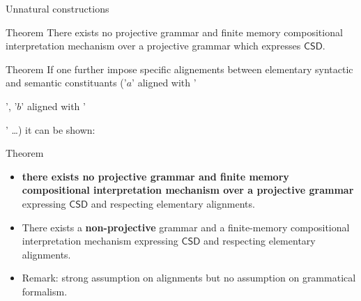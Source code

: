 \documentclass{beamer}
\begin{document}
\begin{frame}{Unnatural constructions}
  \begin{alertblock}{ Theorem }
    There exists no projective grammar and finite memory compositional interpretation mechanism over a projective grammar which expresses $\mathsf{CSD}$.
  \end{alertblock}

\end{frame}


\begin{frame}{Theorem}
  If one further impose specific alignements between elementary syntactic and semantic constituants ('$a$' aligned with '', '$b$' aligned with '' \dots) %
  it can be shown:

  \begin{block}{Theorem}
    \begin{itemize}
    \item \textbf{there exists no projective grammar and finite memory compositional interpretation mechanism over a projective grammar} expressing $\mathsf{CSD}$ and respecting elementary alignments.
    \item There exists a \textbf{non-projective} grammar and a finite-memory compositional interpretation mechanism expressing $\mathsf{CSD}$ and respecting elementary alignments.
    \item Remark: strong assumption on alignments but no assumption on grammatical formalism.
    \end{itemize}
  \end{block}
\end{frame}
\end{document}
